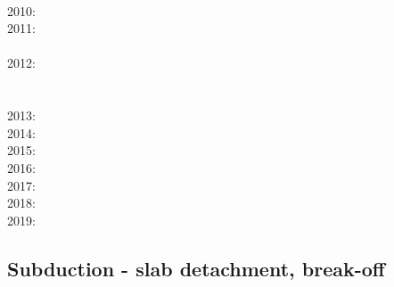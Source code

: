       \cite{huby09}\\
2010: \cite{hagr10}\cite{lobh10}\cite{mamb10}\cite{camg10}\cite{casm10}\cite{ligb10}\cite{stfc10}
      \cite{moyb10}\cite{zhst10}\cite{qusp10}\cite{moht10}\cite{leki10}\cite{sigb10}\\
2011: \cite{lixg11}\cite{list11}\cite{bubj11}\cite{bagw11b}\cite{cafz11}\cite{geme11}\cite{qube11}\\
      \cite{blgg11}\cite{gery11b}\cite{leki11}\cite{scsf11}\\
2012: \cite{anwb12}\cite{jahu12}\cite{jabi12}\cite{jabk12}\cite{lixg12}\cite{grpy12}\cite{grpy12b}\\
      \cite{ronb12}\cite{tebu12}\cite{thka12}\cite{bova12}\cite{civs12}\cite{camo12}\cite{cafa12} \\
      \cite{gebk12}\cite{liri12}\cite{beva12}\cite{uegb12}\cite{bija12}\cite{sigb12}\\
2013: \cite{nabg13}\cite{hage13}\cite{ancv13}\cite{namu13}\cite{yosh13}\cite{zhgt13}\cite{lixg13} 
      \cite{jabr13}\cite{izht13}\cite{luws13}\cite{dusc13}\cite{tibb13}\cite{bubj13}\cite{scmo13} 
      \cite{fuob13}\cite{magc13}\cite{musi13}\cite{mibg13}\cite{grpy13}\cite{vagd13a}\cite{vagd13b}
      \cite{cavg13}\cite{vocg13}\cite{qula13}\cite{bugu13}\\
2014: \cite{robn14}\cite{hond14}\cite{ronc14}\cite{mobm14}\cite{famc14}\cite{fogm14}\cite{frba14} 
      \cite{gagd14}\cite{voge14}\cite{voge14b}\cite{lidr14}\cite{bocj04}\cite{bagb14}\cite{stjm14}
      \cite{basc14}\cite{vamd14}\cite{kile14}\cite{jahm14}\cite{bufa14}\cite{bufy14b}\cite{chsv14}
      \cite{chsg14}\cite{sigb14}\cite{shjm14}\\
2015: \cite{bemm15}\cite{bomv15}\cite{bogf15}\cite{ceag15}\cite{kifr15}\cite{vami15}\cite{dali15}\\
2016: \cite{tomy16}\cite{gukt16}\cite{robn16}\cite{mavm16}\\
2017: \cite{kicf17}\cite{sche17}\cite{pest17}\cite{vomc17}\cite{majf17}\cite{yabr17}\\
2018: \cite{yamz18}\cite{crli18}\cite{spcv18}\cite{chss18}\\
2019: \cite{magn19}\cite{mavb19}\cite{scvm19}\cite{cakc19}\cite{samo19}

\subsection*{Subduction - slab detachment, break-off}
 

